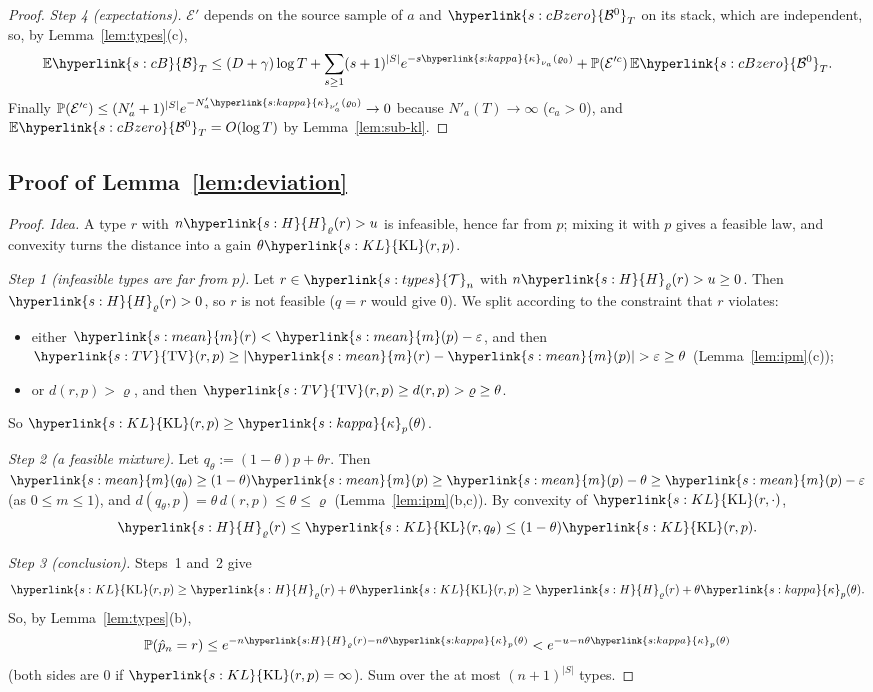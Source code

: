 \documentclass[11pt]{article}
\newcommand{\E}{\mathbb{E}}
\newcommand{\PP}{\mathbb{P}}
\newcommand{\cE}{\mathcal{E}}
\newcommand{\sy}[2]{{\hyperlink{#1}{#2}}}
\newcommand{\mean}{\sy{s:mean}{m}}
\newcommand{\KL}{\sy{s:KL}{\mathrm{KL}}}
\newcommand{\TV}{\sy{s:TV}{\mathrm{TV}}}
\newcommand{\cB}{\sy{s:cB}{\mathcal{B}}}
\newcommand{\cBz}{\sy{s:cBzero}{\mathcal{B}^{0}}}
\newcommand{\Hr}{\sy{s:H}{H}}
\newcommand{\kap}{\sy{s:kappa}{\kappa}}
\newcommand{\Tn}{\sy{s:types}{\mathcal{T}}}
\begin{document}
\begin{proof}
\emph{Step 4 (expectations).} $\cE'$ depends on the source sample of $a$ and $\cBz_T$ on its stack,
which are independent, so, by Lemma~\ref{lem:types}(c),
\begin{equation*}
\E\cB_T\le(D+\gamma)\log T+\sum_{s\ge1}(s+1)^{|S|}e^{-s\kap_{\nu_a}(\varrho_0)}+\PP(\cE'^c)\,\E\cBz_T .
\end{equation*}
Finally $\PP(\cE'^c)\le(N'_a+1)^{|S|}e^{-N'_a\kap_{\nu'_a}(\varrho_0)}\to0$ because
$N'_a(T)\to\infty$ ($c_a>0$), and $\E\cBz_T=O(\log T)$ by Lemma~\ref{lem:sub-kl}.
\end{proof}

\subsection{Proof of Lemma~\ref{lem:deviation}}\label{sec:proof-lem-deviation}

\begin{proof}
\emph{Idea.} A type $r$ with $n\Hr_\varrho(r)>u$ is infeasible, hence far from $p$; mixing it with $p$
gives a feasible law, and convexity turns the distance into a gain $\theta\KL(r,p)$.

\emph{Step 1 (infeasible types are far from $p$).} Let $r\in\Tn_n$ with $n\Hr_\varrho(r)>u\ge0$.
Then $\Hr_\varrho(r)>0$, so $r$ is not feasible ($q=r$ would give $0$). We split according to the
constraint that $r$ violates:
\begin{itemize}
\item either $\mean(r)<\mean(p)-\varepsilon$, and then $\TV(r,p)\ge|\mean(r)-\mean(p)|>\varepsilon\ge\theta$
  (Lemma~\ref{lem:ipm}(c));
\item or $d(r,p)>\varrho$, and then $\TV(r,p)\ge d(r,p)>\varrho\ge\theta$.
\end{itemize}
So $\KL(r,p)\ge\kap_p(\theta)$.

\emph{Step 2 (a feasible mixture).} Let $q_\theta:=(1-\theta)p+\theta r$. Then
$\mean(q_\theta)\ge(1-\theta)\mean(p)\ge \mean(p)-\theta\ge \mean(p)-\varepsilon$ (as $0\le m\le1$), and
$d(q_\theta,p)=\theta\,d(r,p)\le\theta\le\varrho$ (Lemma~\ref{lem:ipm}(b,c)). By convexity of
$\KL(r,\cdot)$,
\begin{equation*}
\Hr_\varrho(r)\le\KL(r,q_\theta)\le(1-\theta)\KL(r,p).
\end{equation*}

\emph{Step 3 (conclusion).} Steps~1 and~2 give
\begin{equation*}
\KL(r,p)\ge \Hr_\varrho(r)+\theta\KL(r,p)\ge \Hr_\varrho(r)+\theta\kap_p(\theta).
\end{equation*}
So, by Lemma~\ref{lem:types}(b),
\begin{equation*}
\PP(\hat p_n=r)\le e^{-n\Hr_\varrho(r)-n\theta\kap_p(\theta)}<e^{-u-n\theta\kap_p(\theta)}
\end{equation*}
(both sides are $0$ if $\KL(r,p)=\infty$). Sum over the at most $(n+1)^{|S|}$ types.
\end{proof}
\end{document}
